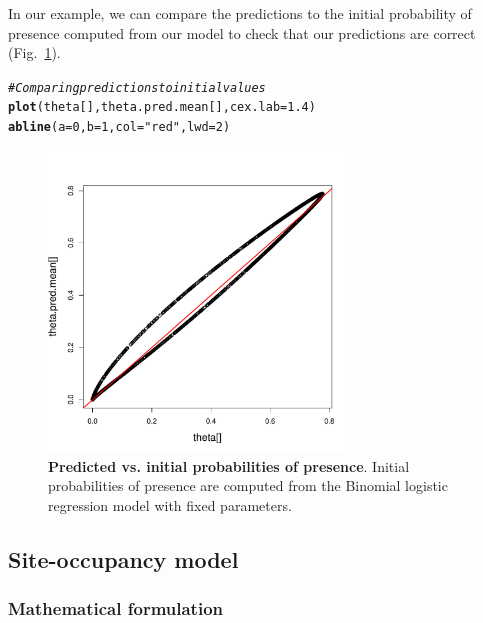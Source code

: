 \documentclass[a4paper, 12pt, leqno]{article}\usepackage[]{graphicx}\usepackage[]{color}
\makeatletter
\newcommand{\hlnum}[1]{\textcolor[rgb]{0.686,0.059,0.569}{#1}}%
\newcommand{\hlstr}[1]{\textcolor[rgb]{0.192,0.494,0.8}{#1}}%
\newcommand{\hlcom}[1]{\textcolor[rgb]{0.678,0.584,0.686}{\textit{#1}}}%
\newcommand{\hlstd}[1]{\textcolor[rgb]{0.345,0.345,0.345}{#1}}%
\newcommand{\hlkwc}[1]{\textcolor[rgb]{0.333,0.667,0.333}{#1}}%
\newcommand{\hlkwd}[1]{\textcolor[rgb]{0.737,0.353,0.396}{\textbf{#1}}}%
\newenvironment{kframe}{%
 \def\at@end@of@kframe{}%
 \ifinner\ifhmode%
  \def\at@end@of@kframe{\end{minipage}}%
  \begin{minipage}{\columnwidth}%
 \fi\fi%
 \def\FrameCommand##1{\hskip\@totalleftmargin \hskip-\fboxsep
 \colorbox{shadecolor}{##1}\hskip-\fboxsep
     \hskip-\linewidth \hskip-\@totalleftmargin \hskip\columnwidth}%
 \MakeFramed {\advance\hsize-\width
   \@totalleftmargin\z@ \linewidth\hsize
   \@setminipage}}%
 {\par\unskip\endMakeFramed%
 \at@end@of@kframe}
\newenvironment{knitrout}{}{} %
\makeatother
\begin{document}
In our example, we can compare the predictions to the initial probability of presence
computed from our model to check that our predictions are correct
(Fig.~\ref{fig:pred-obs-binomial}).

\begin{knitrout}\small
{}\color{fgcolor}\begin{kframe}
\begin{alltt}
\hlcom{# Comparing predictions to initial values}
\hlkwd{plot}\hlstd{(theta[],theta.pred.mean[],}\hlkwc{cex.lab}\hlstd{=}\hlnum{1.4}\hlstd{)}
\hlkwd{abline}\hlstd{(}\hlkwc{a}\hlstd{=}\hlnum{0}\hlstd{,}\hlkwc{b}\hlstd{=}\hlnum{1}\hlstd{,}\hlkwc{col}\hlstd{=}\hlstr{"red"}\hlstd{,}\hlkwc{lwd}\hlstd{=}\hlnum{2}\hlstd{)}
\end{alltt}
\end{kframe}
\end{knitrout}


\begin{figure}[!h] 
  \centering \includegraphics[width=8cm]{figures/pred-obs-binomial.pdf}
  
  \caption{\textbf{Predicted vs. initial probabilities of presence}. Initial probabilities
    of presence are computed from the Binomial logistic regression model with fixed
    parameters.}
  
  \label{fig:pred-obs-binomial}
  
\end{figure}

\subsection{Site-occupancy model}

\subsubsection{Mathematical formulation}
\end{document}
